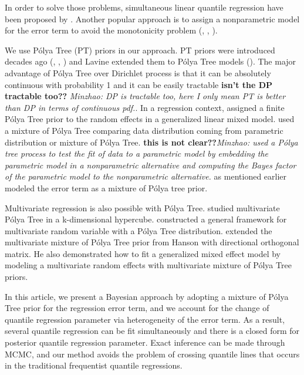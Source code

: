 \documentclass[12pt]{article}
\newcommand{\polya}{P\'{o}lya}
\begin{document}
In order to solve those problems, simultaneous linear quantile
regression have been proposed by \citet{tokdar2011}. 
Another popular approach is to assign a nonparametric model for the
error term to avoid the monotonicity problem (\citet{scaccia2003},
\citet{geweke2007}, \citet{taddy2010}).

We use \polya{} Tree (PT) priors in our approach. PT priors were introduced
decades ago (\citet{freedman1963}, \citet{fabius1964},
\citet{ferguson1974})  and  Lavine
extended them to \polya{} Tree models (\citet{lavine1992, lavine1994}). The
major advantage of 
\polya{} Tree over Dirichlet process is that it can be absolutely
continuous with probability 1 and it can be easily tractable {\bf
  isn't the DP tractable too??} {\it Minzhao: DP is tractable too,
  here I only mean PT is better than DP in terms of continuous pdf.}. In
a regression context, \citet{walker1997, walker1999} assigned a finite
\polya{} Tree 
prior to the random effects in a generalized linear mixed
model. \citet{berger2001}  used a mixture
of \polya{} Tree comparing data distribution coming from parametric
distribution or mixture of \polya{} Tree. {\bf this is not
  clear??}{\it Minzhao: used a \polya{} tree process to test the fit
  of data to a parametric model by embedding the parametric model in a
  nonparametric alternative and computing the Bayes factor of the
  parametric model to the nonparametric alternative.}
\citet{hanson2002} as mentioned earlier 
modeled the error term as a mixture of \polya{} tree
prior. 

Multivariate regression is also possible with \polya{}
Tree. \citet{paddock1999, paddock2002}
studied multivariate \polya{} Tree in a k-dimensional
hypercube. \citet{hanson2006} 
constructed a general framework for multivariate random 
variable with a \polya{} Tree distribution. \citet{jara2009} extended the multivariate
mixture of \polya{} Tree prior from Hanson with directional orthogonal
matrix.
He also demonstrated how to fit a
generalized mixed effect model by modeling a multivariate random effects
with multivariate mixture of \polya{} Tree priors. 

In this article, we present a Bayesian approach by adopting a mixture
of \polya{} Tree prior for the regression error term, and we account
for 
the change of quantile regression parameter via heterogeneity of the
error term. As a result, several quantile regression can be fit
simultaneously and there is a closed form for  posterior quantile
regression parameter. Exact inference can be made through MCMC, and
our method avoids the problem of 
crossing quantile lines that occurs in the
traditional frequentist quantile regressions. 
\end{document}
